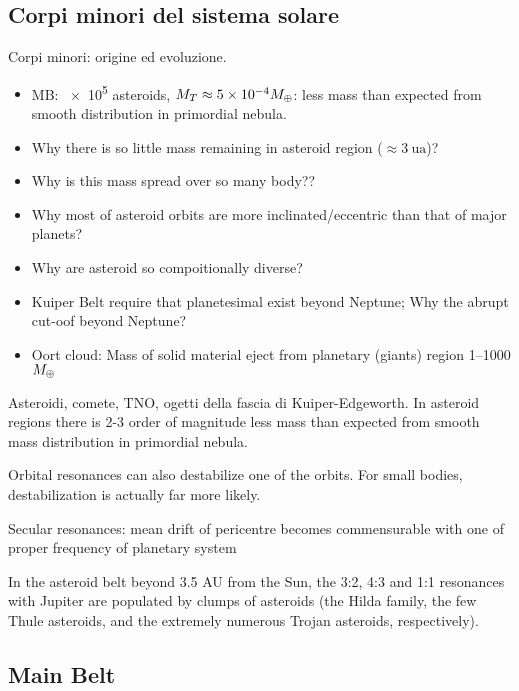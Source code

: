 \subsection{Corpi minori del sistema solare}

\begin{frame}{Corpi minori: origine ed evoluzione.}
\begin{itemize}
\item MB: \num{e5} asteroids, $M_{T}\approx\num{5e-4}M_{\oplus}{}$: less mass than expected from smooth distribution in primordial nebula.
\item Why there is so little mass remaining in asteroid region ($\approx\SI{3}{\astronomicalunit}$)? 
\item Why is this mass spread over so many body??
\item Why most of asteroid orbits are more inclinated/eccentric than that of major planets?
\item Why are asteroid so compoitionally diverse?
\item Kuiper Belt require that planetesimal exist beyond Neptune; Why the abrupt cut-oof beyond Neptune?
\item Oort cloud: Mass of solid material eject from planetary (giants) region \numrange{1}{1000}$M_{\oplus}{}$
\end{itemize}
\end{frame}

\begin{wordonframe}{Asteroidi, comete, TNO, ogetti della fascia di Kuiper-Edgeworth.}
In asteroid regions there is 2-3 order of magnitude less mass than expected from smooth mass distribution in primordial nebula.

Orbital resonances can also destabilize one of the orbits. For small bodies, destabilization is actually far more likely.

Secular resonances: mean drift of pericentre becomes commensurable with one of proper frequency of planetary system

In the asteroid belt beyond 3.5 AU from the Sun, the 3:2, 4:3 and 1:1 resonances with Jupiter are populated by clumps of asteroids (the Hilda family, the few Thule asteroids, and the extremely numerous Trojan asteroids, respectively).
\end{wordonframe}

\subsection{Main Belt}

